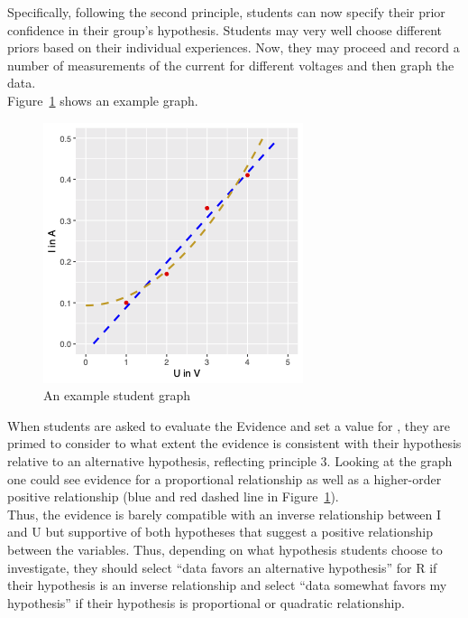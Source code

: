 \documentclass[man, floatsintext]{apa7} %
\begin{document}
Specifically, following the second principle, students can now specify their prior confidence in their group’s hypothesis. Students may very well choose different priors based on their individual experiences. Now, they may proceed and record a number of measurements of the current for different voltages and then graph the data. \\

Figure~\ref{fig:example-student-graph} shows an example graph. \\

\begin{figure}[h]
\begin{center}
\includegraphics[width = .5\paperwidth]{ohm-graph.png}
\caption{An example student graph}
\label{fig:example-student-graph}
\end{center}
\end{figure}

When students are asked to evaluate the Evidence and set a value for , they are primed to consider to what extent the evidence is consistent with their hypothesis relative to an alternative hypothesis, reflecting principle 3. Looking at the graph one could see evidence for a proportional relationship as well as a higher-order positive relationship (blue and red dashed line in Figure~\ref{fig:example-student-graph}). \\

Thus, the evidence is barely compatible with an inverse relationship between I and U but supportive of both hypotheses that suggest a positive relationship between the variables. Thus, depending on what hypothesis students choose to investigate, they should select “data favors an alternative hypothesis” for R if their hypothesis is an inverse relationship and select “data somewhat favors my hypothesis” if their hypothesis is proportional or quadratic relationship. \\
\end{document}
